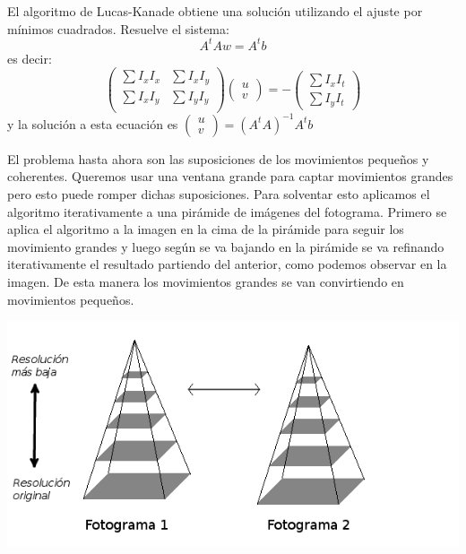 \documentclass[a4paper,openright, 12pt]{book}
\begin{document}
El algoritmo de Lucas-Kanade obtiene una solución utilizando el ajuste por mínimos cuadrados. Resuelve el sistema:
\begin{equation*}
A^t Aw=A^t b
\end{equation*}
es decir:
\begin{equation*}
\left(
\begin{matrix}
\sum I_x I_x & \sum I_x I_y\\
\sum I_x I_y & \sum I_y I_y\\
\end{matrix}
\right)
\left(\begin{array}{c}u\\v\end{array}\right)
=
- \left(\begin{array}{c} \sum I_x I_t\\ \sum I_y I_t\end{array}\right)
\end{equation*}
y la solución a esta ecuación es $\left(\begin{array}{c}u\\v\end{array}\right) = (A^t A)^{-1} A^t b $  

El problema hasta ahora son las suposiciones de los movimientos pequeños y coherentes. Queremos usar una ventana grande para captar movimientos grandes pero esto puede romper dichas suposiciones. Para solventar esto aplicamos el algoritmo iterativamente a una pirámide de imágenes del fotograma. Primero se aplica el algoritmo a la imagen en la cima de la pirámide para seguir los movimiento grandes y luego según se va bajando en la pirámide se va refinando iterativamente el resultado partiendo del anterior, como podemos observar en la imagen. De esta manera los movimientos grandes se van convirtiendo en movimientos pequeños.


\includegraphics{pyramid}
\end{document}
